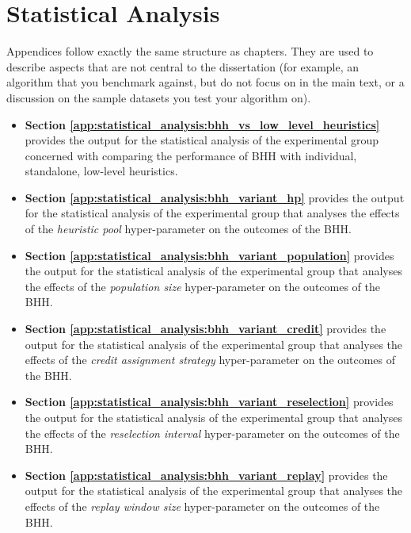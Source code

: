 \chapter{Statistical Analysis}
\label{app:statistical_analysis}

Appendices follow exactly the same structure as chapters. They are used to
describe aspects that are not central to the dissertation (for example, an
algorithm that you benchmark against, but do not focus on in the main text, or a
discussion on the sample datasets you test your algorithm on).


\begin{itemize}
	\item \textbf{Section \ref{app:statistical_analysis:bhh_vs_low_level_heuristics}} provides the output for the statistical analysis of the experimental group concerned with comparing the performance of \acs{BHH} with individual, standalone, low-level heuristics.

	\item \textbf{Section \ref{app:statistical_analysis:bhh_variant_hp}} provides the output for the statistical analysis of the experimental group that analyses the effects of the \textit{heuristic pool} hyper-parameter on the outcomes of the \acs{BHH}.

	\item \textbf{Section \ref{app:statistical_analysis:bhh_variant_population}} provides the output for the statistical analysis of the experimental group that analyses the effects of the \textit{population size} hyper-parameter on the outcomes of the \acs{BHH}.

	\item \textbf{Section \ref{app:statistical_analysis:bhh_variant_credit}} provides the output for the statistical analysis of the experimental group that analyses the effects of the \textit{credit assignment strategy} hyper-parameter on the outcomes of the \acs{BHH}.

	\item \textbf{Section \ref{app:statistical_analysis:bhh_variant_reselection}} provides the output for the statistical analysis of the experimental group that analyses the effects of the \textit{reselection interval} hyper-parameter on the outcomes of the \acs{BHH}.

	\item \textbf{Section \ref{app:statistical_analysis:bhh_variant_replay}} provides the output for the statistical analysis of the experimental group that analyses the effects of the \textit{replay window size} hyper-parameter on the outcomes of the \acs{BHH}.


\end{itemize}
